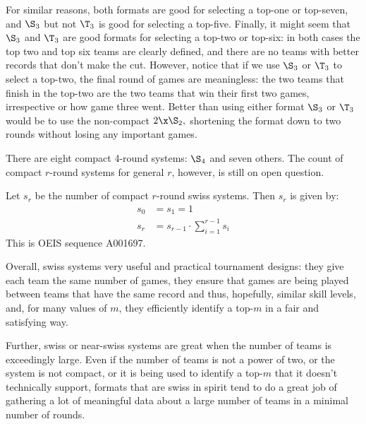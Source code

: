 {    For similar reasons, both formats are good for selecting a top-one or top-seven, and $\S_3$ but not $\T_3$ is good for selecting a top-five. Finally, it might seem that $\S_3$ and $\T_3$ are good formats for selecting a top-two or top-six: in both cases the top two and top six teams are clearly defined, and there are no teams with better records that don't make the cut. However, notice that if we use $\S_3$ or $\T_3$ to select a top-two, the final round of games are meaningless: the two teams that finish in the top-two are the two teams that win their first two games, irrespective or how game three went. Better than using either format $\S_3$ or $\T_3$ would be to use the non-compact $2\x\S_2,$ shortening the format down to two rounds without losing any important games.

    There are eight compact 4-round systems: $\S_4$ and seven others. The count of compact $r$-round systems for general $r$, however, is still on open question.

    \begin{conj}{}{}
        Let $s_r$ be the number of compact $r$-round swiss systems. Then $s_r$ is given by:
        \begin{align*}
            s_0 &= s_ 1 = 1\\
            s_r &= s_{r-1} \cdot \sum_{i=1}^{r-1}s_i
        \end{align*}
        This is OEIS sequence A001697.
    \end{conj}

    Overall, swiss systems very useful and practical tournament designs: they give each team the same number of games, they ensure that games are being played between teams that have the same record and thus, hopefully, similar skill levels, and, for many values of $m$, they efficiently identify a top-$m$ in a fair and satisfying way.

    Further, swiss or near-swiss systems are great when the number of teams is exceedingly large. Even if the number of teams is not a power of two, or the system is not compact, or it is being used to identify a top-$m$ that it doesn't technically support, formats that are swiss in spirit tend to do a great job of gathering a lot of meaningful data about a large number of teams in a minimal number of rounds.
}



